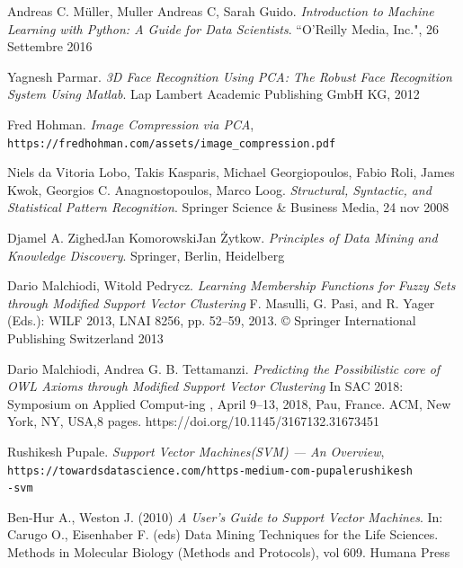 \documentclass[12pt,italian]{report}
\begin{document}
\begin{thebibliography}{9}
	Andreas C. Müller, Muller Andreas C, Sarah Guido. 
	\textit{Introduction to Machine Learning with Python: A Guide for Data Scientists}. 
	``O'Reilly Media, Inc.", 26 Settembre 2016

	Yagnesh Parmar. 
	\textit{3D Face Recognition Using PCA: The Robust Face Recognition System Using Matlab}. 
	Lap Lambert Academic Publishing GmbH KG, 2012

	Fred Hohman. \textit{Image Compression via PCA}, \\\texttt{https://fredhohman.com/assets/image\_compression.pdf}

	Niels da Vitoria Lobo, Takis Kasparis, Michael Georgiopoulos, Fabio Roli, James Kwok, Georgios C. Anagnostopoulos, Marco Loog. \textit{Structural, Syntactic, and Statistical Pattern Recognition}. 
	Springer Science \& Business Media, 24 nov 2008

	Djamel A. ZighedJan KomorowskiJan Żytkow. \textit{Principles of Data Mining and Knowledge Discovery}. 
	Springer, Berlin, Heidelberg
	
	Dario Malchiodi, Witold Pedrycz.
	\textit{Learning Membership Functions for Fuzzy Sets
	through Modified Support Vector Clustering}
	F. Masulli, G. Pasi, and R. Yager (Eds.): WILF 2013, LNAI 8256, pp. 52–59, 2013.
	© Springer International Publishing Switzerland 2013
 
	Dario Malchiodi, Andrea G. B. Tettamanzi.
	\textit{Predicting the Possibilistic core of OWL Axioms through Modified Support Vector Clustering}
	In SAC 2018: Symposium on Applied Comput-ing , April 9–13, 2018, Pau, France. ACM, New York, NY, USA,8 pages. https://doi.org/10.1145/3167132.31673451
 	
 	Rushikesh Pupale. \textit{Support Vector Machines(SVM) — An Overview}, \\\texttt{https://towardsdatascience.com/https-medium-com-pupalerushikesh\\-svm}
 	
	Ben-Hur A., Weston J. (2010) \textit{A User’s Guide to Support Vector Machines}. In: Carugo O., Eisenhaber F. (eds) Data Mining Techniques for the Life Sciences. Methods in Molecular Biology (Methods and Protocols), vol 609. Humana Press
 	

\end{thebibliography}
\end{document}

